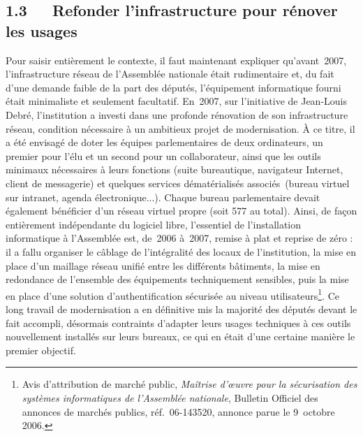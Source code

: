 \documentclass{FramateX}
\begin{document}
\begin{refsection}
\subsection*{1.3~~~Refonder l'infrastructure pour rénover les usages}
{}

Pour saisir entièrement le contexte, il faut maintenant expliquer
qu'avant~2007, l'infrastructure réseau de l'Assemblée nationale était
rudimentaire et, du fait d'une demande faible de la part des députés,
l'équipement informatique fourni était minimaliste et seulement
facultatif. En~2007, sur l'initiative de Jean-Louis Debré,
l'institution a investi dans une profonde rénovation de son
infrastructure réseau, condition nécessaire à un ambitieux projet de
modernisation. À ce titre, il a été envisagé de doter les équipes
parlementaires de deux ordinateurs, un premier pour l'élu et un second
pour un collaborateur, ainsi que les outils minimaux nécessaires à
leurs fonctions (suite bureautique, navigateur Internet, client de
messagerie) et quelques services dématérialisés associés~(bureau
virtuel sur intranet, agenda électronique...). Chaque bureau
parlementaire devait également bénéficier d'un réseau virtuel propre
(soit 577 au total). Ainsi, de façon entièrement indépendante du
logiciel libre, l'essentiel de l'installation informatique à
l'Assemblée est, de~2006 à~2007, remise à plat et reprise de zéro : il
a fallu organiser le câblage de l'intégralité des locaux de
l'institution, la mise en place d'un maillage réseau unifié entre les
différents bâtiments, la mise en redondance de l'ensemble des
équipements techniquement sensibles, puis la mise en place d'une
solution d'authentification sécurisée au niveau
utilisateurs\footnote{Avis d'attribution de marché public,
\textit{Maîtrise d'œuvre pour la sécurisation des systèmes
informatiques de l'Assemblée nationale}, Bulletin Officiel des annonces
de marchés publics, réf.~06-143520, annonce parue le 9~octobre 2006.}.
Ce long travail de modernisation a en définitive mis la majorité des
députés devant le fait accompli, désormais contraints d'adapter leurs
usages techniques à ces outils nouvellement installés sur leurs
bureaux, ce qui en était d'une certaine manière le premier objectif.


\end{refsection}
\end{document}
